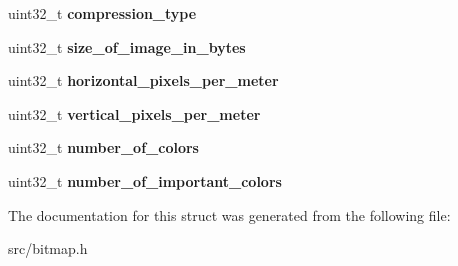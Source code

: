 \begin{DoxyCompactItemize}
\item 
\hypertarget{structbitmap__header__t_aabd7e7afc3a789e3cd5c0952681092eb}{uint32\+\_\+t {\bfseries compression\+\_\+type}}\label{structbitmap__header__t_aabd7e7afc3a789e3cd5c0952681092eb}

\item 
\hypertarget{structbitmap__header__t_ab98b3d3cb0972f8aa862f696ddeedc48}{uint32\+\_\+t {\bfseries size\+\_\+of\+\_\+image\+\_\+in\+\_\+bytes}}\label{structbitmap__header__t_ab98b3d3cb0972f8aa862f696ddeedc48}

\item 
\hypertarget{structbitmap__header__t_aed9639fa7fe967fe0c07c06c00cdd47e}{uint32\+\_\+t {\bfseries horizontal\+\_\+pixels\+\_\+per\+\_\+meter}}\label{structbitmap__header__t_aed9639fa7fe967fe0c07c06c00cdd47e}

\item 
\hypertarget{structbitmap__header__t_a88043e51e87b5b6f709e8b90ca47234d}{uint32\+\_\+t {\bfseries vertical\+\_\+pixels\+\_\+per\+\_\+meter}}\label{structbitmap__header__t_a88043e51e87b5b6f709e8b90ca47234d}

\item 
\hypertarget{structbitmap__header__t_a3e4f590620ebaabffb82b439ed760f65}{uint32\+\_\+t {\bfseries number\+\_\+of\+\_\+colors}}\label{structbitmap__header__t_a3e4f590620ebaabffb82b439ed760f65}

\item 
\hypertarget{structbitmap__header__t_ac0418bf89e5d250e8504d2710aa03f31}{uint32\+\_\+t {\bfseries number\+\_\+of\+\_\+important\+\_\+colors}}\label{structbitmap__header__t_ac0418bf89e5d250e8504d2710aa03f31}

\end{DoxyCompactItemize}


The documentation for this struct was generated from the following file\+:\begin{DoxyCompactItemize}
\item 
src/bitmap.\+h\end{DoxyCompactItemize}
